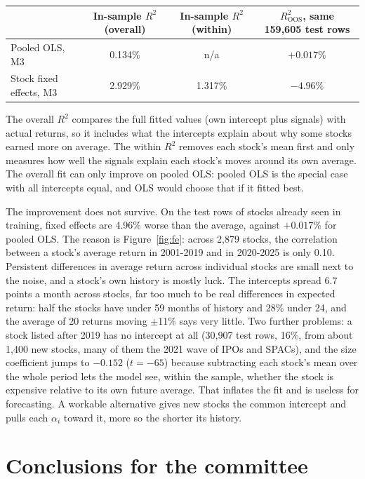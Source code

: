 \documentclass[10pt,a4paper]{article}
\begin{document}
\begin{center}\small
\begin{tabular}{lccc}
\toprule
& In-sample $R^2$ (overall) & In-sample $R^2$ (within) & $R^2_{\text{OOS}}$, same 159,605 test rows \\
\midrule
Pooled OLS, M3 & 0.134\% & n/a & $+0.017\%$ \\
Stock fixed effects, M3 & 2.929\% & 1.317\% & $-4.96\%$ \\
\bottomrule
\end{tabular}
\end{center}

The overall $R^2$ compares the full fitted values (own intercept plus signals) with actual returns, so it includes
what the intercepts explain about why some stocks earned more on average. The within $R^2$ removes each stock's mean
first and only measures how well the signals explain each stock's moves around its own average. The overall fit can only improve on pooled OLS: pooled OLS is the special
case with all intercepts equal, and OLS would choose that if it fitted best.

The improvement does not survive. On the test rows of stocks already seen in training, fixed effects are 4.96\% worse
than the average, against $+0.017\%$ for pooled OLS. The reason is Figure~\ref{fig:fe}: across 2,879 stocks, the correlation between a stock's average return in 2001-2019
and in 2020-2025 is only 0.10. Persistent differences in average return across individual stocks are small next to
the noise, and a stock's own history is mostly luck. The intercepts spread 6.7 points a month across stocks, far too much to be
real differences in expected return: half the stocks have under 59 months of history and 28\% under 24, and the
average of 20 returns moving $\pm$11\% says very little. Two further problems: a stock listed after 2019 has no intercept at all (30,907 test rows, 16\%, from about 1,400 new
stocks, many of them the 2021 wave of IPOs and SPACs), and the size coefficient jumps to $-0.152$ ($t=-65$) because
subtracting each stock's mean over the whole period lets the model see, within the sample, whether the stock is
expensive relative to its own future average. That inflates the fit and is useless for forecasting. A workable
alternative gives new stocks the common intercept and pulls each $\alpha_i$ toward it, more so the shorter its
history.

\section{Conclusions for the committee}
\end{document}
